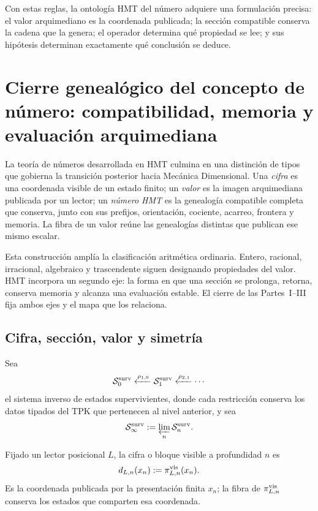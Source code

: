 Con estas reglas, la ontolog\'ia HMT del n\'umero adquiere una formulaci\'on
precisa: el valor arquimediano es la coordenada publicada; la secci\'on
compatible conserva la cadena que la genera; el operador determina qu\'e
propiedad se lee; y sus hipótesis determinan exactamente qu\'e conclusión se
deduce.


\section[Cierre genealógico del concepto de número]{Cierre genealógico del concepto de número: compatibilidad, memoria y evaluación arquimediana}
\label{p3-83-c44-s2:chap:cierre-genealogico-numero}

La teoría de números desarrollada en HMT culmina en una distinción de tipos
que gobierna la transición posterior hacia Mecánica Dimensional. Una
\emph{cifra} es una coordenada visible de un estado finito; un \emph{valor}
es la imagen arquimediana publicada por un lector; un \emph{número HMT} es
la genealogía compatible completa que conserva, junto con sus prefijos,
orientación, cociente, acarreo, frontera y memoria. La fibra de un valor
reúne las genealogías distintas que publican ese mismo escalar.

Esta construcción amplía la clasificación aritmética ordinaria. Entero,
racional, irracional, algebraico y trascendente siguen designando
propiedades del valor. HMT incorpora un segundo eje: la forma en que una
sección se prolonga, retorna, conserva memoria y alcanza una evaluación
estable. El cierre de las Partes~I--III fija ambos ejes y el mapa que los relaciona.

\subsection{Cifra, sección, valor y simetría}

Sea
\[
 \mathcal S_0^{\rm surv}
 \xleftarrow{\rho_{1,0}}
 \mathcal S_1^{\rm surv}
 \xleftarrow{\rho_{2,1}}
 \cdots
\]
el sistema inverso de estados supervivientes, donde cada restricción
conserva los datos tipados del TPK que pertenecen al nivel anterior, y sea
\[
 \mathcal S_\infty^{\rm surv}
 :=\varprojlim_n\mathcal S_n^{\rm surv}.
\]

\begin{definition}[Cifra]
\label{p3-83-c44-s2:def:cifra-visible-genealogica}
Fijado un lector posicional \(L\), la cifra o bloque visible a profundidad
\(n\) es
\[
 d_{L,n}(x_n):=\pi^{\rm vis}_{L,n}(x_n).
\]
Es la coordenada publicada por la presentación finita \(x_n\); la fibra de
\(\pi^{\rm vis}_{L,n}\) conserva los estados que comparten esa coordenada.
\end{definition}

